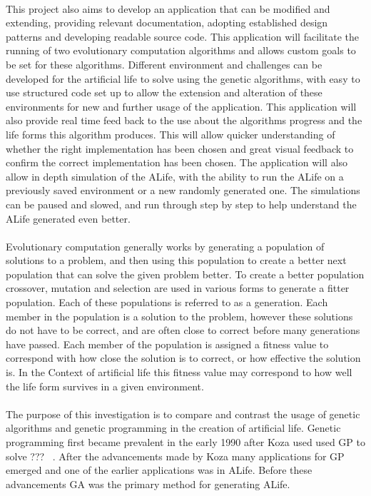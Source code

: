 \documentclass[12pt]{article}
\begin{document}
\paragraph{}
This project also aims to develop an application that can be modified and extending, providing relevant documentation, adopting established design
patterns and developing readable source code. This application will facilitate the running of two evolutionary computation algorithms and allows
custom goals to be set for these algorithms. Different environment and challenges can be developed for the artificial life to solve using the 
genetic algorithms, with easy to use structured code set up to allow the extension and alteration of these environments for new and further
usage of the application. This application will also provide real time feed back to the use about the algorithms progress and the life forms
this algorithm produces. This will allow quicker understanding of whether the right implementation has been chosen and great visual feedback
to confirm the correct implementation has been chosen. The application will also allow in depth simulation of the ALife, with the ability to 
run the ALife on a previously saved environment or a new randomly generated one. The simulations can be paused and slowed, and run through 
step by step to help understand the ALife generated even better. 


\paragraph{}
Evolutionary computation generally works by generating a population of solutions to a problem, and then using this population to create a better next population that can solve the given problem better.
To create a better population crossover, mutation and selection are used in various forms to generate a fitter population.
Each of these populations is referred to as a generation.
Each member in the population is a solution to the problem, however these solutions do not have to be correct, and are often close to correct before many generations have passed.
Each member of the population is assigned a fitness value to correspond with how close the solution is to correct, or how effective the solution is.
In the Context of artificial life this fitness value may correspond to how well the life form survives in a given environment.

\paragraph{}
The purpose of this investigation is to compare and contrast the usage of genetic algorithms and genetic programming in the creation of artificial life. Genetic programming first became prevalent in the early 1990 after Koza used used GP to solve ??? ~\cite{Koza90}. After the advancements made by Koza many applications for GP emerged and one of the earlier applications was in ALife. Before these advancements GA was the primary method for generating ALife.
\end{document}
